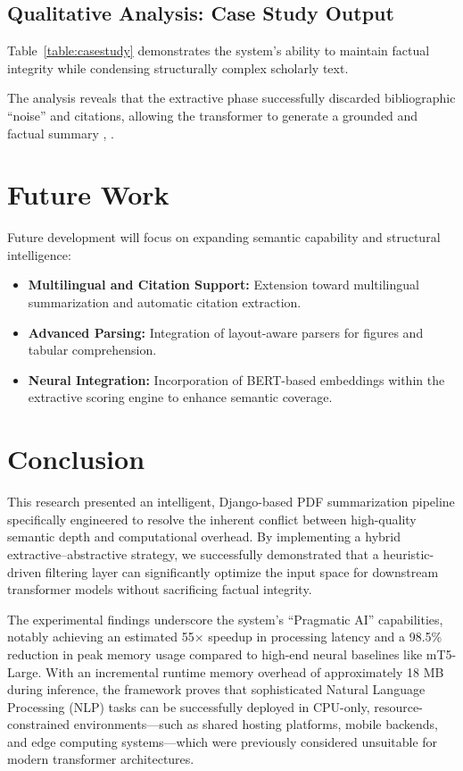 \documentclass[conference]{IEEEtran}
\begin{document}
\begin{itemize}
\subsection{Qualitative Analysis: Case Study Output}

Table~\ref{table:casestudy} demonstrates the system's ability to maintain factual integrity while condensing structurally complex scholarly text.


The analysis reveals that the extractive phase successfully discarded bibliographic ``noise'' and citations, allowing the transformer to generate a grounded and factual summary \cite{7}, \cite{8}.




\section{Future Work}
Future development will focus on expanding semantic capability and structural intelligence\cite{24}:
\begin{itemize}
    \item \textbf{Multilingual and Citation Support:} Extension toward multilingual summarization\cite{4, 24} and automatic citation extraction\cite{19}.
    \item \textbf{Advanced Parsing:} Integration of layout-aware parsers\cite{23} for figures and tabular comprehension\cite{10, 23}.
    \item \textbf{Neural Integration:} Incorporation of BERT-based embeddings\cite{11, 22} within the extractive scoring engine to enhance semantic coverage\cite{22}.
\end{itemize}

\section{Conclusion}
This research presented an intelligent, Django-based PDF summarization pipeline specifically engineered to resolve the inherent conflict between high-quality semantic depth and computational overhead. By implementing a hybrid extractive–abstractive strategy, we successfully demonstrated that a heuristic-driven filtering layer can significantly optimize the input space for downstream transformer models without sacrificing factual integrity\cite{14}.

The experimental findings underscore the system's ``Pragmatic AI'' capabilities\cite{8}, notably achieving an estimated 55$\times$ speedup in processing latency and a 98.5\% reduction in peak memory usage compared to high-end neural baselines like mT5-Large\cite{4}. With an incremental runtime memory overhead of approximately 18 MB during inference, the framework proves that sophisticated Natural Language Processing (NLP) tasks can be successfully deployed in CPU-only, resource-constrained environments\cite{16}---such as shared hosting platforms, mobile backends, and edge computing systems---which were previously considered unsuitable for modern transformer architectures\cite{12}.


\end{itemize}
\end{document}
